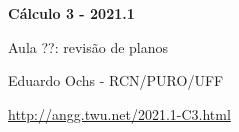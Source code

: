 \documentclass[oneside,12pt]{article}
\begin{document}


%
%

\def\drafturl{http://angg.twu.net/LATEX/2021-1-C3.pdf}
\def\drafturl{http://angg.twu.net/2021.1-C3.html}
\def\draftfooter{\tiny \href{\drafturl}{\jobname{}} \ColorBrown{\shorttoday{} \hours}}



%

\thispagestyle{empty}

\begin{center}

\vspace*{1.2cm}

{\bf \Large Cálculo 3 - 2021.1}

\bsk

Aula ??: revisão de planos

\bsk

Eduardo Ochs - RCN/PURO/UFF

\url{http://angg.twu.net/2021.1-C3.html}

\end{center}

\newpage
\end{document}

